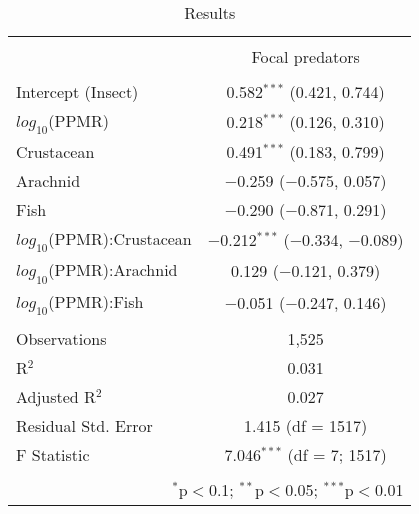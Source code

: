 
\begin{table}[!htbp] \centering 
  \caption{Results} 
  \label{tab:n-ppmr_byPreds} 
\begin{tabular}{@{\extracolsep{5pt}}lc} 
\\[-1.8ex]\hline 
\hline \\[-1.8ex] 
 & \multicolumn{1}{c}{Focal predators} \\ 
\cline{2-2} 
\hline \\[-1.8ex] 
 Intercept (Insect) & 0.582$^{***}$ (0.421, 0.744) \\ 
  $log_{10}$(PPMR) & 0.218$^{***}$ (0.126, 0.310) \\ 
  Crustacean & 0.491$^{***}$ (0.183, 0.799) \\ 
  Arachnid & $-$0.259 ($-$0.575, 0.057) \\ 
  Fish & $-$0.290 ($-$0.871, 0.291) \\ 
  $log_{10}$(PPMR):Crustacean & $-$0.212$^{***}$ ($-$0.334, $-$0.089) \\ 
  $log_{10}$(PPMR):Arachnid & 0.129 ($-$0.121, 0.379) \\ 
  $log_{10}$(PPMR):Fish & $-$0.051 ($-$0.247, 0.146) \\ 
 \hline \\[-1.8ex] 
Observations & 1,525 \\ 
R$^{2}$ & 0.031 \\ 
Adjusted R$^{2}$ & 0.027 \\ 
Residual Std. Error & 1.415 (df = 1517) \\ 
F Statistic & 7.046$^{***}$ (df = 7; 1517) \\ 
\hline 
\hline \\[-1.8ex] 
\multicolumn{2}{r}{$^{*}$p$<$0.1; $^{**}$p$<$0.05; $^{***}$p$<$0.01} \\ 
\end{tabular} 
\end{table} 
